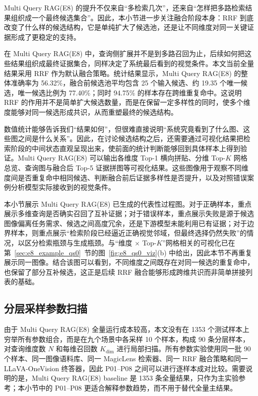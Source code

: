 Multi Query RAG(E8) 的提升不仅来自“多检索几次”，还来自“怎样把多路检索结果组织成一个最终候选集合”。因此，本小节进一步关注融合阶段本身：RRF 到底改变了什么样的候选结构，它是单纯扩大了候选池，还是让不同维度对同一关键证据形成了更稳定的支持。

在 Multi Query RAG(E8) 中，查询侧扩展并不是到多路召回为止，后续如何把这些结果组织成最终证据集合，同样决定了系统最后看到的视觉条件。本文当前全量结果采用 RRF 作为默认融合策略。统计结果显示，Multi Query RAG(E8) 的整体准确率为 56.32\%，融合前候选池平均包含 25 个输入候选、约 19.35 个唯一候选，唯一候选比例为 77.40\%；同时 94.75\% 的样本存在跨维重复命中。这说明 RRF 的作用并不是简单扩大候选数量，而是在保留一定多样性的同时，使多个维度能够对同一候选形成共识，从而重塑最终的候选结构。

数值统计能够告诉我们“结果如何”，但很难直接说明“系统究竟看到了什么图、这些图之间是什么关系”。因此，在讨论候选结构之后，还需要通过可视化结果把检索阶段的中间状态直观呈现出来，使前面的统计判断能够回到具体样本上得到验证。Multi Query RAG(E8) 可以输出各维度 Top-1 横向拼贴、分维 Top-$K$ 网格总览、查询图与融合后 Top-5 证据拼图等可视化结果。这些图像用于观察不同维度间是否重复命中相同候选、判断融合前后证据多样性是否提升，以及对照错误案例分析模型实际接收到的视觉条件。

本小节展示 Multi Query RAG(E8) 已生成的代表性过程图。对于正确样本，重点展示多维查询是否确实召回了互补证据；对于错误样本，重点展示失败是源于候选图像偏离任务需求、候选之间高度冗余，还是下游模型未能利用已有证据；对于边界样本，则重点展示“检索阶段已经逼近正确视觉邻域，但最终选择仍然失败”的情况，以区分检索瓶颈与生成瓶颈。与“维度 $\times$ Top-$K$”网格相关的可视化已在第~\ref{sec:e8_example_qs0}~节的图~\ref{fig:e8_qs0_viz}(b) 中给出，因此本节不再重复展示同一图像。结合该图可以看到，不同维度之间既存在对同一候选的重复命中，也保留了部分互补候选，这正是后续 RRF 融合能够形成跨维共识而非简单拼接列表的基础。

\subsection{分层采样参数扫描}

由于 Multi Query RAG(E8) 全量运行成本较高，本文没有在 1353 个测试样本上穷举所有参数组合，而是在九个场景中各采样 10 个样本，构成 90 条分层样本，对查询维度数 $N$ 和每维召回数 $K_{\mathrm{dim}}$ 进行局部扫描。所有参数实验使用同一批 90 个样本、同一图像语料库、同一 MagicLens 检索器、同一 RRF 融合策略和同一 LLaVA-OneVision 终答器，因此 P01--P08 之间可以进行逐样本成对比较。需要说明的是，Multi Query RAG(E8) baseline 是 1353 条全量结果，只作为主实验参考；本小节中的 P01--P08 更适合解释参数趋势，而不用于替代全量主结果。


